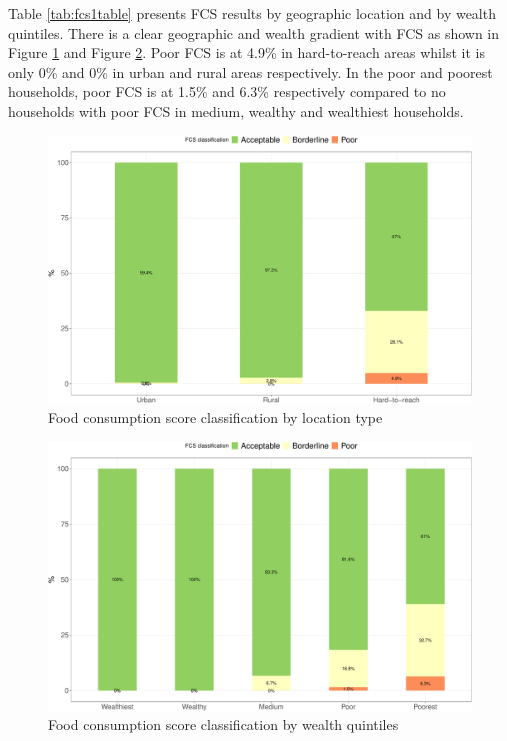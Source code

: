 \documentclass[12pt,a4paper]{article}
\begin{document}
Table \ref{tab:fcs1table} presents FCS results by geographic location and by wealth quintiles. There is a clear geographic and wealth gradient with FCS as shown in Figure \ref{fig:fcs1plot} and Figure \ref{fig:fcs2plot}. Poor FCS is at 4.9\% in hard-to-reach areas whilst it is only 0\% and 0\% in urban and rural areas respectively. In the poor and poorest households, poor FCS is at 1.5\% and 6.3\% respectively compared to no households with poor FCS in medium, wealthy and wealthiest households.

\newpage

\begin{figure}[H]

{\centering \includegraphics{kayahReport_files/figure-latex/fcs1plot-1} 

}

\caption{Food consumption score classification by location type}\label{fig:fcs1plot}
\end{figure}

\begin{figure}[H]

{\centering \includegraphics{kayahReport_files/figure-latex/fcs2plot-1} 

}

\caption{Food consumption score classification by wealth quintiles}\label{fig:fcs2plot}
\end{figure}
\end{document}
